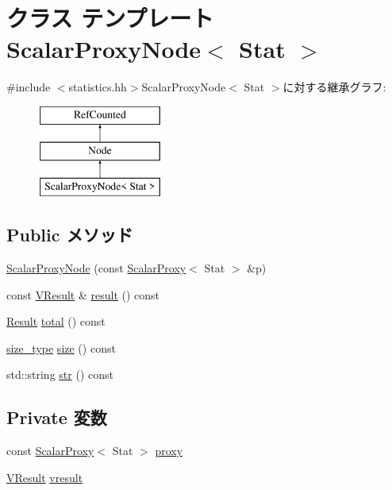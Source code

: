 \hypertarget{classStats_1_1ScalarProxyNode}{
\section{クラス テンプレート ScalarProxyNode$<$ Stat $>$}
\label{classStats_1_1ScalarProxyNode}
}


{\ttfamily \#include $<$statistics.hh$>$}ScalarProxyNode$<$ Stat $>$に対する継承グラフ:\begin{figure}[H]
\begin{center}
\leavevmode
\includegraphics[height=3cm]{classStats_1_1ScalarProxyNode}
\end{center}
\end{figure}
\subsection*{Public メソッド}
\begin{DoxyCompactItemize}
\item 
\hyperlink{classStats_1_1ScalarProxyNode_aaaa8b262149b18fc4951b6be48ba1fdc}{ScalarProxyNode} (const \hyperlink{classStats_1_1ScalarProxy}{ScalarProxy}$<$ Stat $>$ \&p)
\item 
const \hyperlink{classstd_1_1vector}{VResult} \& \hyperlink{classStats_1_1ScalarProxyNode_aba312f9e3431b1652f8b3ddf3fe105dc}{result} () const 
\item 
\hyperlink{namespaceStats_ad874d2cfd4b4a29ebd480bb2e67f20ae}{Result} \hyperlink{classStats_1_1ScalarProxyNode_a35c6e2ed3fc81b40d69052a062113ead}{total} () const 
\item 
\hyperlink{namespaceStats_ada51e68d31936547d3729c82daf6b7c6}{size\_\-type} \hyperlink{classStats_1_1ScalarProxyNode_a503ab01f6c0142145d3434f6924714e7}{size} () const 
\item 
std::string \hyperlink{classStats_1_1ScalarProxyNode_a1b9b8885b0880fc4ddf9a2c7d1ca3dc4}{str} () const 
\end{DoxyCompactItemize}
\subsection*{Private 変数}
\begin{DoxyCompactItemize}
\item 
const \hyperlink{classStats_1_1ScalarProxy}{ScalarProxy}$<$ Stat $>$ \hyperlink{classStats_1_1ScalarProxyNode_a99c66bf770906ef1ea3ca0f9a02d87df}{proxy}
\item 
\hyperlink{classstd_1_1vector}{VResult} \hyperlink{classStats_1_1ScalarProxyNode_a8f41af856442757ec68f3391333d3eb2}{vresult}
\end{DoxyCompactItemize}
